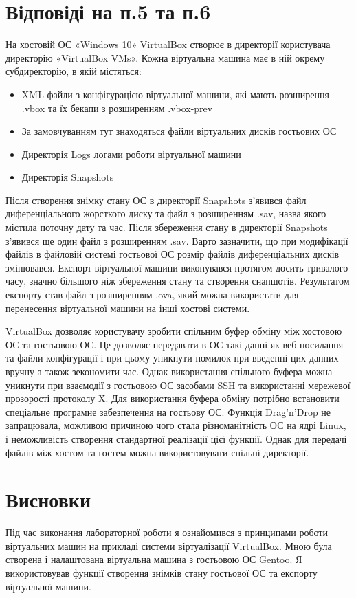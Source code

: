 \documentclass[12pt,a4paper]{article}
\begin{document}
\section{Відповіді на п.5 та п.6}
На хостовій ОС «Windows 10» VirtualBox створює в директорії користувача 
директорію «VirtualBox VMs». Кожна віртуальна машина має в ній окрему субдиректорію, в якій містяться:
\begin{itemize}
	\item XML файли з конфігурацією віртуальної машини, які мають розширення 
	.vbox та їх бекапи з розширенням .vbox-prev
	\item За замовчуванням тут знаходяться файли віртуальних дисків 
	гостьових ОС
	\item Директорія Logs логами роботи віртуальної машини
	\item Директорія Snapshots
\end{itemize}
Після створення знімку стану ОС в директорії Snapshots з'явився файл
диференціального жорсткого диску та файл з розширенням .sav, назва
якого містила поточну дату та час.
Після збереження стану в директорії Snapshots з'явився ще один файл з
розширенням .sav.
Варто зазначити, що при модифікації файлів в файловій системі гостьової
ОС розмір файлів диференціальних дисків змінювався.
Експорт віртуальної машини виконувався протягом  досить тривалого часу,
значно більшого ніж збереження стану та створення снапшотів. Результатом
експорту став  файл з розширенням .ova, який можна використати для 
перенесення віртуальної машини на інші хостові системи.

VirtualBox дозволяє користувачу зробити спільним буфер обміну між хостовою ОС
та гостьовою ОС. Це дозволяє передавати в ОС такі данні як веб-посилання та
файли конфігурації і при цьому уникнути помилок при введенні цих данних 
вручну а також зекономити час. Однак використання спільного буфера можна
уникнути при взаємодії з гостьовою ОС засобами SSH та використанні мережевої
прозорості протоколу X. Для використання буфера обміну потрібно 
встановити спеціальне програмне забезпечення на гостьову ОС. Функція 
Drag'n'Drop не запрацювала, можливою причиною чого стала різноманітність
ОС на ядрі Linux, і неможливість створення стандартної реалізації цієї
функції. Однак для передачі файлів між хостом та гостем можна
використовувати спільні директорії.
\section{Висновки}
Під час виконання лабораторної роботи я ознайомився з принципами роботи
віртуальних машин на прикладі системи віртуалізації VirtualBox.
Мною була створена і налаштована віртуальна машина з гостьовою ОС 
Gentoo. Я використовував функції створення знімків стану гостьової ОС та
експорту віртуальної машини.
\end{document}
